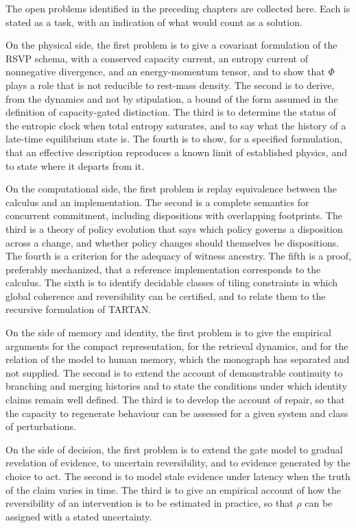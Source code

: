 \documentclass[11pt,twoside,openright]{book}
\theoremstyle{plain}
\theoremstyle{definition}
\theoremstyle{remark}
\newcommand{\rsvp}{RSVP}
\begin{document}
The open problems identified in the preceding chapters are collected here. Each is stated as a task, with an indication of what would count as a solution.

On the physical side, the first problem is to give a covariant formulation of the \rsvp{} schema, with a conserved capacity current, an entropy current of nonnegative divergence, and an energy-momentum tensor, and to show that $\Phi$ plays a role that is not reducible to rest-mass density. The second is to derive, from the dynamics and not by stipulation, a bound of the form assumed in the definition of capacity-gated distinction. The third is to determine the status of the entropic clock when total entropy saturates, and to say what the history of a late-time equilibrium state is. The fourth is to show, for a specified formulation, that an effective description reproduces a known limit of established physics, and to state where it departs from it.

On the computational side, the first problem is replay equivalence between the calculus and an implementation. The second is a complete semantics for concurrent commitment, including dispositions with overlapping footprints. The third is a theory of policy evolution that says which policy governs a disposition across a change, and whether policy changes should themselves be dispositions. The fourth is a criterion for the adequacy of witness ancestry. The fifth is a proof, preferably mechanized, that a reference implementation corresponds to the calculus. The sixth is to identify decidable classes of tiling constraints in which global coherence and reversibility can be certified, and to relate them to the recursive formulation of TARTAN.

On the side of memory and identity, the first problem is to give the empirical arguments for the compact representation, for the retrieval dynamics, and for the relation of the model to human memory, which the monograph has separated and not supplied. The second is to extend the account of demonstrable continuity to branching and merging histories and to state the conditions under which identity claims remain well defined. The third is to develop the account of repair, so that the capacity to regenerate behaviour can be assessed for a given system and class of perturbations.

On the side of decision, the first problem is to extend the gate model to gradual revelation of evidence, to uncertain reversibility, and to evidence generated by the choice to act. The second is to model stale evidence under latency when the truth of the claim varies in time. The third is to give an empirical account of how the reversibility of an intervention is to be estimated in practice, so that $\rho$ can be assigned with a stated uncertainty.
\end{document}
